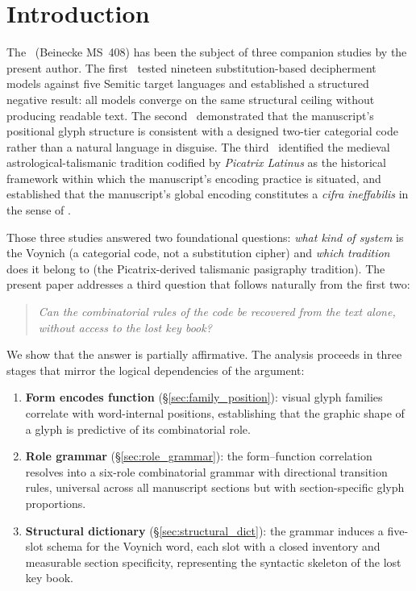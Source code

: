 
\section{Introduction}
\label{sec:introduction}

The \vms\ (Beinecke MS~408) has been the subject of three companion
studies by the present author. The first~\citep{jimenez2026negative}
tested nineteen substitution-based decipherment models against five
Semitic target languages and established a structured negative result:
all models converge on the same structural ceiling without producing
readable text. The second~\citep{jimenez2026twotier} demonstrated that
the manuscript's positional glyph structure is consistent with a
designed two-tier categorial code rather than a natural language in
disguise. The third~\citep{jimenez2026venusring} identified the medieval
astrological-talismanic tradition codified by \textit{Picatrix Latinus}
as the historical framework within which the manuscript's encoding
practice is situated, and established that the manuscript's global
encoding constitutes a \textit{cifra ineffabilis} in the sense of
\citet{martinezgavilan2025}.

Those three studies answered two foundational questions: \emph{what kind
of system} is the Voynich (a categorial code, not a substitution cipher)
and \emph{which tradition} does it belong to (the Picatrix-derived
talismanic pasigraphy tradition). The present paper addresses a third
question that follows naturally from the first two:

\begin{quote}
\emph{Can the combinatorial rules of the code be recovered from the
text alone, without access to the lost key book?}
\end{quote}

We show that the answer is partially affirmative. The analysis proceeds
in three stages that mirror the logical dependencies of the argument:

\begin{enumerate}[nosep]
  \item \textbf{Form encodes function} (\S\ref{sec:family_position}):
    visual glyph families correlate with word-internal positions,
    establishing that the graphic shape of a glyph is predictive of its
    combinatorial role.
  \item \textbf{Role grammar} (\S\ref{sec:role_grammar}): the
    form--function correlation resolves into a six-role combinatorial
    grammar with directional transition rules, universal across all
    manuscript sections but with section-specific glyph proportions.
  \item \textbf{Structural dictionary} (\S\ref{sec:structural_dict}):
    the grammar induces a five-slot schema for the Voynich word, each
    slot with a closed inventory and measurable section specificity,
    representing the syntactic skeleton of the lost key book.
\end{enumerate}


